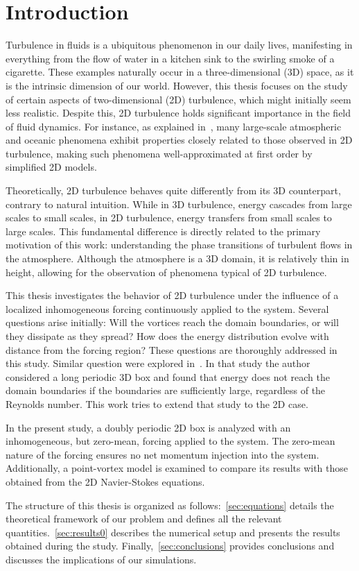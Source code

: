 \documentclass[../main.tex]{subfiles}
\begin{document}
\section{Introduction}
Turbulence in fluids is a ubiquitous phenomenon in our daily lives, manifesting in everything from the flow of water in a kitchen sink to the swirling smoke of a cigarette. These examples naturally occur in a three-dimensional (3D) space, as it is the intrinsic dimension of our world. However, this thesis focuses on the study of certain aspects of two-dimensional (2D) turbulence, which might initially seem less realistic. Despite this, 2D turbulence holds significant importance in the field of fluid dynamics. For instance, as explained in~\cite{2dturbulence}, many large-scale atmospheric and oceanic phenomena exhibit properties closely related to those observed in 2D turbulence, making such phenomena well-approximated at first order by simplified 2D models.

Theoretically, 2D turbulence behaves quite differently from its 3D counterpart, contrary to natural intuition. While in 3D turbulence, energy cascades from large scales to small scales, in 2D turbulence, energy transfers from small scales to large scales. This fundamental difference is directly related to the primary motivation of this work: understanding the phase transitions of turbulent flows in the atmosphere. Although the atmosphere is a 3D domain, it is relatively thin in height, allowing for the observation of phenomena typical of 2D turbulence.

This thesis investigates the behavior of 2D turbulence under the influence of a localized inhomogeneous forcing continuously applied to the system. Several questions arise initially: Will the vortices reach the domain boundaries, or will they dissipate as they spread? How does the energy distribution evolve with distance from the forcing region? These questions are thoroughly addressed in this study. Similar question were explored in~\cite{alexakis}. In that study
the author considered a long periodic 3D box and found that energy does not reach the domain boundaries if the boundaries are sufficiently large, regardless of the Reynolds number. This work tries to extend that study to the 2D case.

In the present study, a doubly periodic 2D box is analyzed with an inhomogeneous, but zero-mean, forcing applied to the system. The zero-mean nature of the forcing ensures no net momentum injection into the system. Additionally, a point-vortex model is examined to compare its results with those obtained from the 2D Navier-Stokes equations.

The structure of this thesis is organized as follows:~\cref{sec:equations} details the theoretical framework of our problem and defines all the relevant quantities.~\cref{sec:results0} describes the numerical setup and presents the results obtained during the study. Finally,~\cref{sec:conclusions} provides conclusions and discusses the implications of our simulations.
\end{document}
